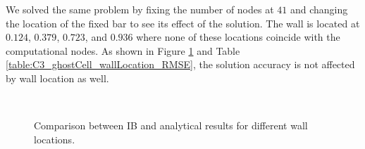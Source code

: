 We solved the same problem by fixing the number of nodes at $41$ and changing the location of the fixed bar to see its effect of the solution. The wall is located at $0.124$, $0.379$, $0.723$, and $0.936$ where none of these locations coincide with the computational nodes. As shown in Figure \ref{fig:C3_ghostCell_wallLocation} and Table \ref{table:C3_ghostCell_wallLocation_RMSE}, the solution accuracy is not affected by wall location as well.

\begin{figure}[H]
    \centering
    \quad
    \\
    \quad
    \caption{Comparison between IB and analytical results for different wall locations.}
    \label{fig:C3_ghostCell_wallLocation}
\end{figure}

